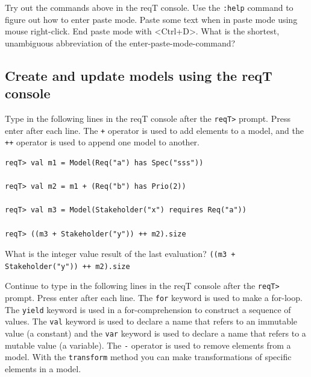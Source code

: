 \documentclass[11pt]{article}
\begin{document}
{\begin{framed}\noindent
Try out the commands above in the reqT console. Use the \verb+:help+ command to figure out how to enter paste mode. Paste some text when in paste mode using mouse right-click. End paste mode with <Ctrl+D>. What is the shortest, unambiguous abbreviation of the enter-paste-mode-command?  \underline{\hspace{2cm}}
\end{framed}}

\subsection{Create and update models using the reqT console}

\begin{framed}\noindent
Type in the following lines in the reqT console after the \verb+reqT>+ prompt. Press enter after each line. The \verb?+? operator is used to add elements to a model, and the  \verb?++? operator is used to append one model to another.

{\small\begin{verbatim}
reqT> val m1 = Model(Req("a") has Spec("sss"))

reqT> val m2 = m1 + (Req("b") has Prio(2))

reqT> val m3 = Model(Stakeholder("x") requires Req("a"))

reqT> ((m3 + Stakeholder("y")) ++ m2).size
\end{verbatim}}


\noindent What is the integer value result of the last evaluation? 
\newline 
\verb?((m3 + Stakeholder("y")) ++ m2).size?
\newline
\newline \underline{\hspace{10cm}}

\vspace{7mm}
\noindent Continue to type in the following lines in the reqT console after the \verb+reqT>+ prompt. Press enter after each line. The \verb+for+ keyword is used to make a for-loop. The \verb+yield+ keyword is used in a for-comprehension to construct a sequence of values.  The \verb+val+ keyword is used to declare a name that refers to an immutable value (a constant) and the \verb+var+ keyword is used to declare a name that refers to a mutable value (a variable). The \verb?-? operator is used to remove elements from a model. With the \verb+transform+ method you can make transformations of specific elements in a model. 



\end{framed}
\end{document}
